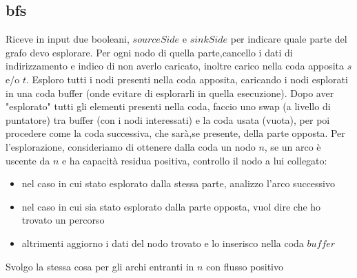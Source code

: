 \documentclass{article}
\begin{document}
\subsection{bfs}

Riceve in input due booleani, $sourceSide$ e $sinkSide$ per indicare quale parte del grafo devo esplorare.
Per ogni nodo di quella parte,cancello i dati di indirizzamento e indico di non averlo caricato, inoltre carico nella coda apposita $s$ e/o $t$.
Esploro tutti i nodi presenti nella coda apposita, caricando i nodi esplorati in una coda buffer (onde evitare di esplorarli in quella esecuzione).
Dopo aver "esplorato" tutti gli elementi presenti nella coda, faccio uno swap (a livello di puntatore) tra buffer (con i nodi interessati) e la coda usata (vuota), per poi procedere come la coda successiva, che sarà,se presente, della parte opposta.
Per l'esplorazione, consideriamo di ottenere dalla coda un nodo $n$, se un arco è uscente da $n$ e ha capacità residua positiva, controllo il nodo a lui collegato:
\begin{itemize}
    \item nel caso in cui stato esplorato dalla stessa parte, analizzo l'arco successivo
    \item nel caso in cui sia stato esplorato dalla parte opposta, vuol dire che ho trovato un percorso
    \item altrimenti aggiorno i dati del nodo trovato e lo inserisco nella coda $buffer$
\end{itemize}
Svolgo la stessa cosa per gli archi entranti in $n$ con flusso positivo
\end{document}
